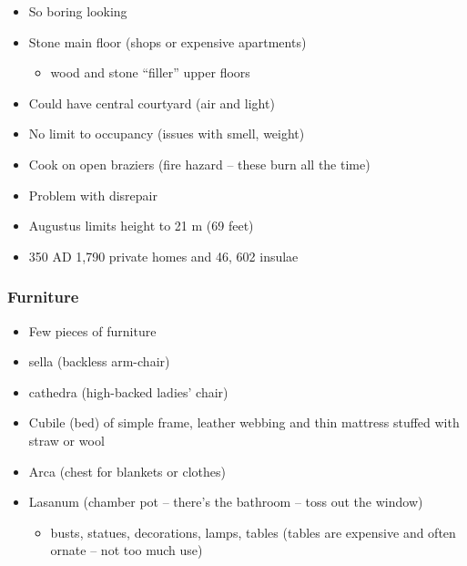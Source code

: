 \documentclass[12pt, twoside]{article}
\begin{document}
\begin{itemize}
\item So boring looking
\item Stone main floor (shops or expensive apartments)
	\begin{itemize}
	\item wood and stone “filler” upper floors
	\end{itemize}
\item Could have central courtyard (air and light)
\item No limit to occupancy (issues with smell, weight)
\item Cook on open braziers (fire hazard – these burn all the time)
\item Problem with disrepair
\item Augustus limits height to 21 m (69 feet)
\item 350 AD 1,790 private homes and 46, 602 insulae
\end{itemize}

\subsubsection{Furniture}
\begin{itemize}
\item Few pieces of furniture
\item sella (backless arm-chair)
\item cathedra (high-backed ladies' chair)
\item Cubile (bed) of simple frame, leather webbing and thin mattress stuffed with straw or wool
\item Arca (chest for blankets or clothes)
\item Lasanum (chamber pot – there's the bathroom – toss out  the window)
	\begin{itemize}
	\item busts, statues, decorations, lamps, tables (tables are expensive and often ornate – not too much use)
	\end{itemize}
\end{itemize}
\end{document}
